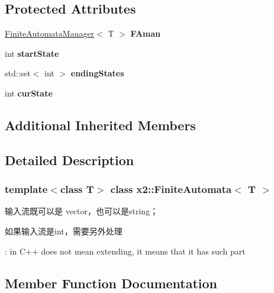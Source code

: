 \subsection*{Protected Attributes}
\begin{DoxyCompactItemize}
\item 
\mbox{\label{classx2_1_1_finite_automata_a260a676437a198ee7d0c9a3881ac6089}} 
\hyperlink{classx2_1_1_finite_automata_manager}{Finite\+Automata\+Manager}$<$ T $>$ {\bfseries F\+Aman}
\item 
\mbox{\label{classx2_1_1_finite_automata_a682403e099f477d982734253cda1fb4d}} 
int {\bfseries start\+State}
\item 
\mbox{\label{classx2_1_1_finite_automata_a5d56c81d319e70709c46dad540ce5ae7}} 
std\+::set$<$ int $>$ {\bfseries ending\+States}
\item 
\mbox{\label{classx2_1_1_finite_automata_a36073aa55410869390e8276ce6e5ebd5}} 
int {\bfseries cur\+State}
\end{DoxyCompactItemize}
\subsection*{Additional Inherited Members}


\subsection{Detailed Description}
\subsubsection*{template$<$class T$>$\newline
class x2\+::\+Finite\+Automata$<$ T $>$}

输入流既可以是 vector，也可以是string；

如果输入流是int，需要另外处理

\+: in C++ does not mean extending, it means that it has such part 

\subsection{Member Function Documentation}
\mbox{\label{classx2_1_1_finite_automata_ac8f011bb86cb9e47370274ae200fc769}} 

